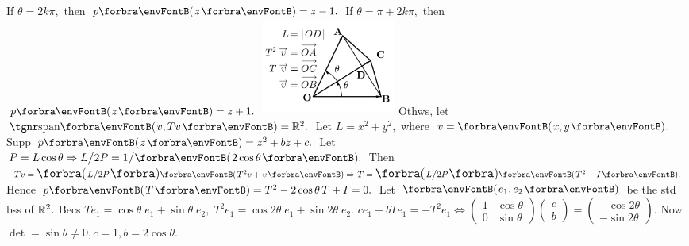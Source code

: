 If $\theta=2k\pi,$ then $p\Par{z}=z-1.$ If $\theta=\pi+2k\pi,$ then $p\Par{z}=z+1.$\vspace{-20pt}\parSol{}
\hfill\includegraphics[width=4.4cm,height=3.2cm,scale=0.22]{diagram5BI-1.png}\Blind{\quad}\vspace{-76pt}\parSol{}
Othws, let $\Span{v,Tv}=\Rbb^2.$ Let $L=x^2+y^2,$ where $v=\Par{x,y}.$\parSol{}
Supp $p\Par{z}=z^2+bz+c.$ Let $P=L\cos\theta\Rightarrow L\big/2P=1\big/\Par{2\cos\theta}.$\parSol{}
Then $Tv=\BigPar{L\big/2P}\Par{T^2 v+v}\Rightarrow T=\BigPar{L\big/2P}\Par{T^2+I}.$\parSol{}
Hence $p\Par{T}=T^2-2\cos\theta\, T+I=0.$\PfEnd\vspace{4pt}\parSol{}
\Or Let $\Par{e_1,e_2}$ be the std bss of ${\mathbb{R}}^2.$ Becs $Te_1=\cos\theta\;e_1+\sin\theta\;e_2,\;T^2e_1=\cos2\theta\;e_1+\sin2\theta\;e_2.$\vspace{0pt}\parSol{}
$ce_1+bTe_1=-T^2 e_1\Longleftrightarrow{}${\small$\begin{pmatrix}1 & \cos\theta\\0 & \sin\theta\end{pmatrix}\begin{pmatrix}c \\ b\end{pmatrix}$}${}={}${\small$\begin{pmatrix}-\cos2\theta\\-\sin2\theta\end{pmatrix}$}. Now $\det=\sin\theta\neq 0,c=1,b=2\cos\theta.$\PfEnd%
\SepLine


